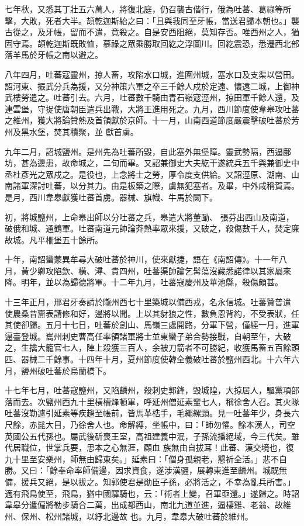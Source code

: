 \begin{pinyinscope}
 七年秋，又悉其丁壯五六萬人，將復北庭，仍召襲古偕行，俄為吐蕃、葛祿等所擊，大敗，死者大半。頡乾迦斯紿之曰：「且與我同至牙帳，當送君歸本朝也。」襲古從之，及牙帳，留而不遣，竟殺之。自是安西阻絕，莫知存否。唯西州之人，猶固守焉。頡乾迦斯既敗恤，慕祿之眾乘勝取回紇之浮圖川。回紇震恐，悉遷西北部落羊馬於牙帳之南以避之。



 八年四月，吐蕃寇靈州，掠人畜，攻陷水口城，進圍州城，塞水口及支渠以營田。詔河東、振武分兵為援，又分神策六軍之卒三千餘人戍於定遠、懷遠二城，上御神武樓勞遣之。吐蕃引去。六月，吐蕃數千騎由青石嶺寇涇州，掠田軍千餘人還，及連雲堡，守捉使唐朝臣遣兵出戰，大將王進用死之。九月，西川節度使韋皋攻吐蕃之維州，獲大將論贊熱及首領獻於京師。十一月，山南西道節度嚴震擊破吐蕃於芳州及黑水堡，焚其積聚，並
 獻首虜。



 九年二月，詔城鹽州。是州先為吐蕃所毀，自此塞外無堡障。靈武勢隔，西逼鄜坊，甚為邊患，故命城之，二旬而畢。又詔兼御史大夫紇干遂統兵五千與兼御史中丞杜彥光之眾戍之。是役也，上念將士之勞，厚令度支供給。又詔涇原、湖南、山南諸軍深討吐蕃，以分其力。由是板築之際，虜無犯塞者。及畢，中外咸稱賀焉。是月，西川韋皋獻獲吐蕃首虜。器械、旗幟、牛馬於闕下。



 初，將城鹽州，上命皋出師以分吐蕃之兵，皋遣大將董勔、
 張芬出西山及南道，破俄和城、通鶴軍。吐蕃南道元帥論莽熱率眾來援，又破之，殺傷數千人，焚定廉故城。凡平柵堡五十餘所。



 十年，南詔蠻蒙異牟尋大破吐蕃於神川，使來獻捷，語在《南詔傳》。十一年八月，黃少卿攻陷欽、橫、潯、貴四州，吐蕃渠帥論乞髯蕩沒藏悉諾律以其家屬來降。明年，並以為歸德將軍。十二年九月，吐蕃寇慶州及華池縣，殺傷頗甚。



 十三年正月，邢君牙奏請於隴州西七十里築城以備西戎，名永信城。吐蕃贊普遣
 使農桑昔齎表請修和好，邊將以聞。上以其豺狼之性，數負恩背約，不受表狀，任其使卻歸。五月十七日，吐蕃於劍山、馬嶺三處開路，分軍下營，僅經一月，進軍逼臺登城。巂州刺史曹高任率領諸軍將士並東蠻子弟合勢接戰，自朝至午，大破之，生擒大籠官七人，陣上殺獲三百人，余被刀箭者不可勝紀，收獲馬畜五百餘頭匹、器械二千餘事。十四年十月，夏州節度使韓全義破吐蕃於鹽州西北。十六年六月，鹽州破吐蕃於烏蘭橋下。



 十七年七月，吐蕃寇鹽州，又陷麟州，殺刺史郭鋒，毀城隍，大掠居人，驅黨項部落而去。次鹽州西九十里橫槽烽頓軍，呼延州僧延素輩七人，稱徐舍人召。其火隊吐蕃沒勒遽引延素等疾趨至帳前，皆馬革梏手，毛繩縲頸。見一吐蕃年少，身長六尺餘，赤髭大目，乃徐舍人也。命解縛，坐帳中，曰：「師勿懼。餘本漢人，司空英國公五代孫也。屬武後斫喪王室，高祖建義中泯，子孫流播絕域，今三代矣。雖代居職位，世掌兵要，思本之心無涯，顧血
 族無由自拔耳！此蕃、漢交境也，復九十里至安樂州，師無由歸東矣。」延素曰：「僧身孤親老，懇祈全活。」悲不自勝。又曰：「餘奉命率師備邊，因求資食，遂涉漢疆，展轉東進至麟州。城既無備，援兵又絕，是以拔之。知郭使君是勛臣子孫，必將活之，不幸為亂兵所害。」適有飛鳥使至，飛鳥，猶中國驛騎也，云：「術者上變，召軍亟還。」遂歸之。時詔韋皋分遣偏將勒步騎合二萬，出成都西山，南北九道並進，逼棲雞、老翁、故維州、保州、松州諸城，以紓北邊故
 也。九月，韋皋大破吐蕃於維州。




\end{pinyinscope}
